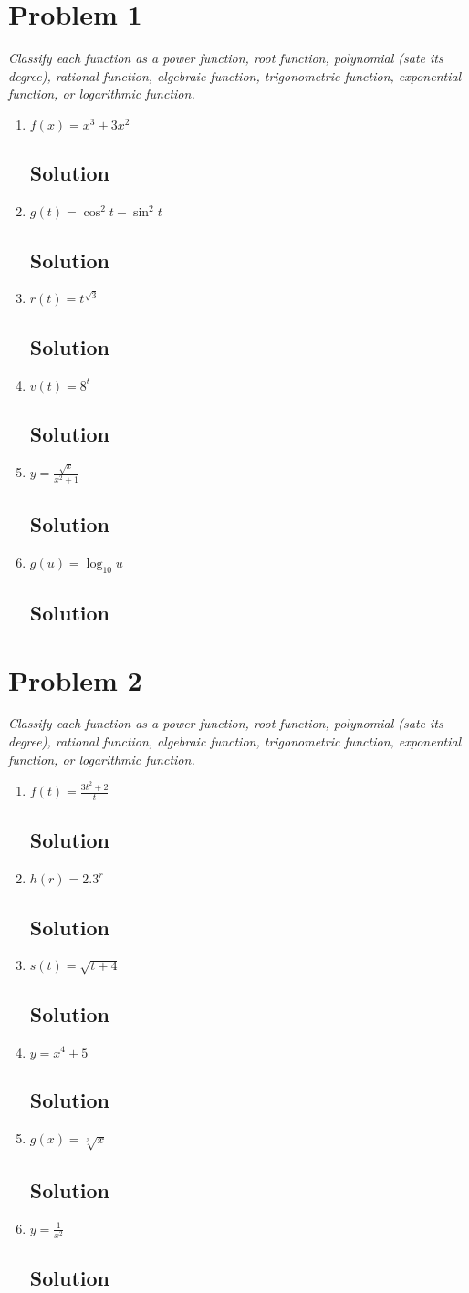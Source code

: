 \documentclass[11pt]{article}
\newcommand{\soln}{\subsection*}
\newcommand{\qn}{\textit}
\begin{document}
\section*{Problem 1}

\qn{Classify each function as a power function, root function, polynomial (sate its degree), rational function, algebraic function, trigonometric function, exponential function, or logarithmic function.}

\begin{enumerate}
	\item $f(x)=x^3+3x^2$
	\soln{Solution}
	
	\item $g(t)=\cos^2t-\sin^2t$
	\soln{Solution}
	
	\item $r(t)=t^{\sqrt{3}}$
	\soln{Solution}
	
	\item $v(t)=8^t$
	\soln{Solution}
	
	\item $y=\frac{\sqrt{x}}{x^2+1}$
	\soln{Solution}
	
	\item $g(u)=\log_{10}{u}$
	\soln{Solution}
\end{enumerate}

\section*{Problem 2}

\qn{Classify each function as a power function, root function, polynomial (sate its degree), rational function, algebraic function, trigonometric function, exponential function, or logarithmic function.}

\begin{enumerate}
	\item $f(t)=\frac{3t^2+2}{t}$
	\soln{Solution}
	
	\item $h(r)=2.3^r$
	\soln{Solution}
	
	\item $s(t)=\sqrt{t+4}$
	\soln{Solution}
	
	\item $y=x^4+5$
	\soln{Solution}
	
	\item $g(x)=\sqrt[3]{x}$
	\soln{Solution}
	
	\item $y=\frac{1}{x^2}$
	\soln{Solution}
\end{enumerate}
\end{document}
